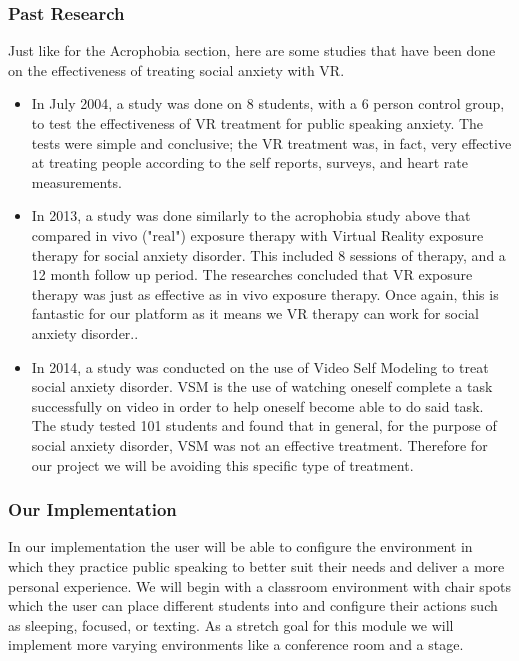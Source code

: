 \documentclass[a4paper,10pt]{article}
\begin{document}
\subsubsection{Past Research}
Just like for the Acrophobia section, here are some studies that have been done on the effectiveness of treating social anxiety with VR.
\begin{itemize}
	\item In July 2004, a study was done on 8 students, with a 6 person control group, to test the effectiveness of VR treatment for public speaking anxiety.  The tests were simple and conclusive; the VR treatment was, in fact, very effective at treating people according to the self reports, surveys, and heart rate measurements.\cite{anxOne}
	\item In 2013, a study was done similarly to the acrophobia study above that compared in vivo ("real") exposure therapy with Virtual Reality exposure therapy for social anxiety disorder.  This included 8 sessions of therapy, and a 12 month follow up period.  The researches concluded that VR exposure therapy was just as effective as in vivo exposure therapy.  Once again, this is fantastic for our platform as it means we VR therapy can work for social anxiety disorder..\cite{anxTwo}
	\item In 2014, a study was conducted on the use of Video Self Modeling to treat social anxiety disorder.  VSM is the use of watching oneself complete a task successfully on video in order to help oneself become able to do said task.  The study tested 101 students and found that in general, for the purpose of social anxiety disorder, VSM was not an effective treatment.  Therefore for our project we will be avoiding this specific type of treatment.\cite{anxThree}
\end{itemize}

\subsubsection{Our Implementation}
In our implementation the user will be able to configure the environment in which they practice public speaking to better suit their needs and deliver a more personal experience. We will begin with a classroom environment with chair spots which the user can place different students into and configure their actions such as sleeping, focused, or texting. As a stretch goal for this module we will implement more varying environments like a conference room and a stage.
\end{document}
